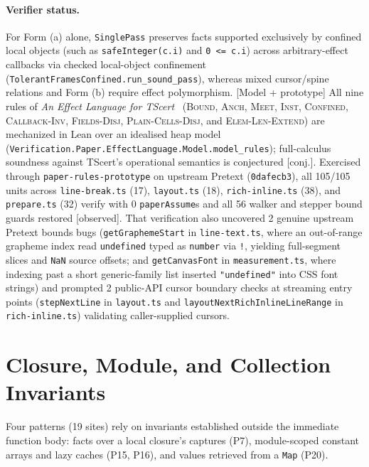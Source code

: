 \documentclass[10pt,a4paper]{article}
\newcommand{\code}[1]{\textcolor{codec}{\texttt{#1}}}
\newcommand{\lean}[1]{\texttt{\small #1}}
\newcommand{\ruleName}[1]{\textcolor{rulec}{\textsc{#1}}}
\newcommand{\statusc}[1]{\textcolor{conjc}{\textsf{\small[#1]}}}
\newcommand{\statuso}[1]{\textcolor{accent}{\textsf{\small[#1]}}}
\newcommand{\entry}[1]{\paragraph{#1.}}
\renewcommand{\lean}[1]{\textcolor{leanc}{\texttt{\small #1}}}%
\begin{document}
\entry{Verifier status}
For Form (a) alone, \lean{SinglePass} preserves facts supported
exclusively by confined local objects (such as \code{safeInteger(c.i)}
and \code{0 <= c.i}) across arbitrary-effect callbacks via checked
local-object confinement (\lean{TolerantFramesConfined.run\_sound\_pass}),
whereas mixed cursor/spine relations and Form (b) require effect
polymorphism. \statuso{Model + prototype} All nine rules of \emph{An
Effect Language for TScert}~\cite{el} (\ruleName{Bound},
\ruleName{Anch}, \ruleName{Meet}, \ruleName{Inst}, \ruleName{Confined},
\ruleName{Callback-Inv}, \ruleName{Fields-Disj},
\ruleName{Plain-Cells-Disj}, and \ruleName{Elem-Len-Extend}) are
mechanized in Lean over an idealised heap model
(\lean{Verification.Paper.EffectLanguage.Model.model\_rules});
full-calculus soundness against TScert's operational semantics is
conjectured \statusc{conj.}. Exercised through
\code{paper-rules-prototype} on upstream Pretext (\code{0dafecb3}), all
105/105 units across \code{line-break.ts} (17), \code{layout.ts} (18),
\code{rich-inline.ts} (38), and \code{prepare.ts} (32) verify with 0
\code{paperAssume}s and all 56 walker and stepper bound guards restored
\statuso{observed}. That verification also uncovered 2 genuine upstream
Pretext bounds bugs (\code{getGraphemeStart} in \code{line-text.ts},
where an out-of-range grapheme index read \code{undefined} typed as
\code{number} via \code{!}, yielding full-segment slices and \code{NaN}
source offsets; and \code{getCanvasFont} in \code{measurement.ts}, where
indexing past a short generic-family list inserted \code{"undefined"}
into CSS font strings) and prompted 2 public-API cursor boundary checks
at streaming entry points (\code{stepNextLine} in \code{layout.ts} and
\code{layoutNextRichInlineLineRange} in \code{rich-inline.ts})
validating caller-supplied cursors.

\section{Closure, Module, and Collection Invariants}\label{sec:state}

Four patterns (19 sites) rely on invariants established outside the
immediate function body: facts over a local closure's captures (P7),
module-scoped constant arrays and lazy caches (P15, P16), and values
retrieved from a \code{Map} (P20).

\end{document}
